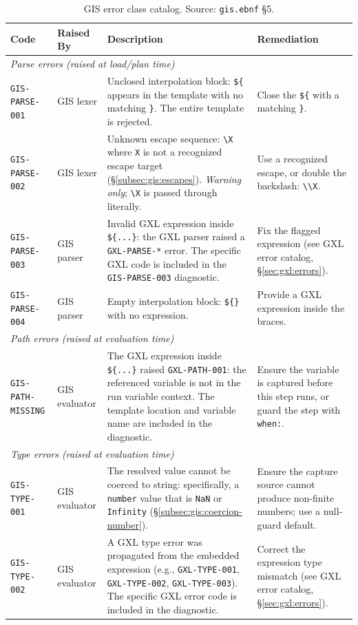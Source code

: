 \begin{table}[ht]
\centering
\begin{tabular}{p{3.5cm}p{2.0cm}p{5.0cm}p{2.5cm}}
\hline
\textbf{Code} & \textbf{Raised By} & \textbf{Description} & \textbf{Remediation} \\
\hline
\multicolumn{4}{l}{\textit{Parse errors (raised at load/plan time)}} \\
\hline
\texttt{GIS-PARSE-001}
  & GIS lexer
  & Unclosed interpolation block: \texttt{\$\{} appears in the template with no matching \texttt{\}}.  The entire template is rejected.
  & Close the \texttt{\$\{} with a matching \texttt{\}}. \\
\texttt{GIS-PARSE-002}
  & GIS lexer
  & Unknown escape sequence: \texttt{\textbackslash X} where \texttt{X} is not a recognized escape target (\S\ref{subsec:gis:escapes}).  \emph{Warning only}; \texttt{\textbackslash X} is passed through literally.
  & Use a recognized escape, or double the backslash: \texttt{\textbackslash\textbackslash X}. \\
\texttt{GIS-PARSE-003}
  & GIS parser
  & Invalid GXL expression inside \texttt{\$\{...\}}: the GXL parser raised a \texttt{GXL-PARSE-*} error.  The specific GXL code is included in the \texttt{GIS-PARSE-003} diagnostic.
  & Fix the flagged expression (see GXL error catalog, \S\ref{sec:gxl:errors}). \\
\texttt{GIS-PARSE-004}
  & GIS parser
  & Empty interpolation block: \texttt{\$\{\}} with no expression.
  & Provide a GXL expression inside the braces. \\
\hline
\multicolumn{4}{l}{\textit{Path errors (raised at evaluation time)}} \\
\hline
\texttt{GIS-PATH-MISSING}
  & GIS evaluator
  & The GXL expression inside \texttt{\$\{...\}} raised \texttt{GXL-PATH-001}: the referenced variable is not in the run variable context.  The template location and variable name are included in the diagnostic.
  & Ensure the variable is captured before this step runs, or guard the step with \texttt{when:}. \\
\hline
\multicolumn{4}{l}{\textit{Type errors (raised at evaluation time)}} \\
\hline
\texttt{GIS-TYPE-001}
  & GIS evaluator
  & The resolved value cannot be coerced to string: specifically, a \texttt{number} value that is \texttt{NaN} or \texttt{Infinity} (\S\ref{subsec:gis:coercion-number}).
  & Ensure the capture source cannot produce non-finite numbers; use a null-guard default. \\
\texttt{GIS-TYPE-002}
  & GIS evaluator
  & A GXL type error was propagated from the embedded expression (e.g., \texttt{GXL-TYPE-001}, \texttt{GXL-TYPE-002}, \texttt{GXL-TYPE-003}).  The specific GXL error code is included in the diagnostic.
  & Correct the expression type mismatch (see GXL error catalog, \S\ref{sec:gxl:errors}). \\
\hline
\end{tabular}
\caption{GIS error class catalog.
  Source: \texttt{gis.ebnf} \S5.}
\label{tab:gis-errors}
\end{table}

